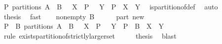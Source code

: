 \begin{isabellebody}
\ {\isachardoublequoteopen}P\ partitions\ {\isacharparenleft}A\ {\isasymunion}\ B{\isacharparenright}\ {\isasymand}\ {\isacharparenleft}{\isasymforall}\ X\ {\isasymin}\ P\ {\isachardot}\ {\isasymexists}\ Y\ {\isasymin}\ P\ {\isachardot}\ X\ {\isasymsubseteq}\ Y{\isacharparenright}{\isachardoublequoteclose}\ \isamarkupfalse%
\ is{\isacharunderscore}partition{\isacharunderscore}of{\isacharunderscore}def\ \isamarkupfalse%
\ auto\isanewline
\ \ \isamarkupfalse%
\ \isamarkupfalse%
\ {\isacharquery}thesis\ \isamarkupfalse%
\ fast\isanewline
{}\isamarkupfalse%
\isanewline
\ \ \isamarkupfalse%
\ non{\isacharunderscore}empty{\isacharcolon}\ {\isachardoublequoteopen}B\ {\isasymnoteq}\ {\isacharbraceleft}{\isacharbraceright}{\isachardoublequoteclose}\isanewline
\ \ \isamarkupfalse%
\ part\ new\ \isamarkupfalse%
\ {\isachardoublequoteopen}{\isacharparenleft}P\ {\isasymunion}\ {\isacharbraceleft}B{\isacharbraceright}{\isacharparenright}\ partitions\ {\isacharparenleft}A\ {\isasymunion}\ B{\isacharparenright}\ {\isasymand}\ {\isacharparenleft}{\isasymforall}\ X\ {\isasymin}\ P\ {\isachardot}\ {\isasymexists}\ Y\ {\isasymin}\ P\ {\isasymunion}\ {\isacharbraceleft}B{\isacharbraceright}\ {\isachardot}\ X\ {\isasymsubseteq}\ Y{\isacharparenright}{\isachardoublequoteclose}\isanewline
\ \ \ \ \isamarkupfalse%
\ {\isacharparenleft}rule\ exists{\isacharunderscore}partition{\isacharunderscore}of{\isacharunderscore}strictly{\isacharunderscore}larger{\isacharunderscore}set{\isacharparenright}\isanewline
\ \ \isamarkupfalse%
\ \isamarkupfalse%
\ {\isacharquery}thesis\ \isamarkupfalse%
\ blast\isanewline
{}\isamarkupfalse%
%
\endisatagproof
{\isafoldproof}%
%
\isadelimproof
\isanewline
%
\endisadelimproof
%
\isadelimtheory
\isanewline
%
\endisadelimtheory
%
\isatagtheory
{}\isamarkupfalse%
%
\endisatagtheory
{\isafoldtheory}%
%
\isadelimtheory
%
\endisadelimtheory
\end{isabellebody}%
